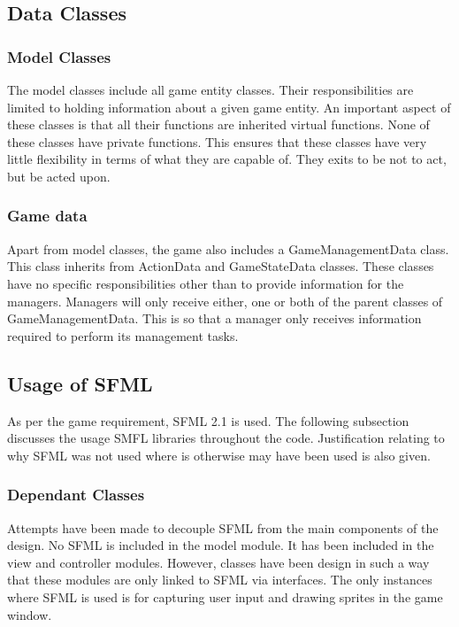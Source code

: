 \documentclass[10pt,twocolumn]{witseiepaper}
\begin{document}
\subsection{Data Classes}
\subsubsection{Model Classes} The model classes include all game entity classes. Their responsibilities are limited to holding information about a given game entity. An important aspect of these classes is that all their functions are inherited virtual functions. None of these classes have private functions. This ensures that these classes have very little flexibility in terms of what they are capable of. They exits to be not to act, but be acted upon.

\subsubsection{Game data} Apart from model classes, the game also includes a GameManagementData class. This class inherits from ActionData and GameStateData classes. These classes have no specific responsibilities other than to provide information for the managers. Managers will only receive either, one or both of the parent classes of GameManagementData. This is so that a manager only receives information required to perform its management tasks.

\subsection{Usage of SFML} %
As per the game requirement, SFML 2.1 is used. The following subsection discusses the usage SMFL libraries throughout the code. Justification relating to why SFML was not used where is otherwise may have been used is also given.

\subsubsection{Dependant Classes}  Attempts have been made to decouple SFML from the main components of the design. No SFML is included in the model module. It has been included in the view and controller modules. However, classes have been design in such a way that these modules are only linked to SFML via interfaces. The only instances where SFML is used is for capturing user input and drawing sprites in the game window.
\end{document}

